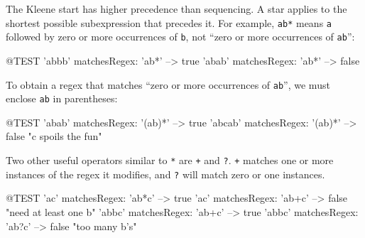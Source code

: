 \documentclass[10pt,twoside,chapterprefix=false]{scrbook}
\renewcommand{\ct}{\lstinline[mathescape=false,basicstyle={\sffamily\upshape}]}
\begin{document}
The Kleene start has higher precedence than sequencing. A star applies to the
shortest possible subexpression that precedes it. For example, \ct{ab*}
means \ct{a} followed by zero or more occurrences of \ct{b}, not ``zero or more
occurrences of \ct{ab}'':
\begin{ToSh-code}{@TEST}
'abbb' matchesRegex: 'ab*' --> true
'abab' matchesRegex: 'ab*' --> false
\end{ToSh-code}

To obtain a regex that matches ``zero or more occurrences of \ct{ab}'', we must enclose \ct{ab} in parentheses:
\begin{ToSh-code}{@TEST}
'abab' matchesRegex: '(ab)*'   --> true
'abcab' matchesRegex: '(ab)*' --> false    "c spoils the fun"
\end{ToSh-code}

Two other useful operators similar to \ct{*} are \ct{+} and \ct{?}.
\ct{+} matches one or more instances of the regex it modifies, and \ct{?} will match zero or one instances.
\begin{ToSh-code}{@TEST}
'ac' matchesRegex: 'ab*c'	   --> true
'ac' matchesRegex: 'ab+c'	  --> false    "need at least one b"
'abbc' matchesRegex: 'ab+c' --> true
'abbc' matchesRegex: 'ab?c' --> false    "too many b's"
\end{ToSh-code}
\end{document}
